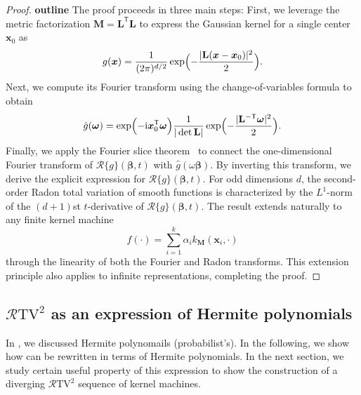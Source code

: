 \begin{proof}{\textbf{outline}}
The proof proceeds in three main steps:
First, we leverage the metric factorization $\mathbf{M}=\mathbf{L}^\mathsf{T}\mathbf{L}$ to express the Gaussian kernel for a single center $\bm{x}_0$ as
\[
g(\bm{x})=\frac{1}{(2\pi)^{d/2}}\exp\Bigl(-\frac{|\mathbf{L}(\bm{x}-\bm{x}_0)|^2}{2}\Bigr).
\]
Next, we compute its Fourier transform using the change-of-variables formula to obtain
\[
\hat{g}(\bm{\omega})=\exp\Bigl(-\mathrm{i}\bm{x}_0^\mathsf{T}\bm{\omega}\Bigr)\frac{1}{|\det \mathbf{L}|}\exp\Bigl(-\frac{|\mathbf{L}^{-\mathsf{T}}\bm{\omega}|^2}{2}\Bigr).
\]
Finally, we apply the Fourier slice theorem~\citep{kak_slaney} 
to connect the one-dimensional Fourier transform of $\mathcal{R}\{g\}(\bm{\beta},t)$ with $\hat{g}(\omega\bm{\beta})$. By inverting this transform, we derive the explicit expression for $\mathcal{R}\{g\}(\bm{\beta},t)$.
For odd dimensions $d$, the second-order Radon total variation of smooth functions is characterized by the $L^1$-norm of the $(d+1)$st $t$-derivative of $\mathcal{R}\{g\}(\bm{\beta},t)$. The result extends naturally to any finite kernel machine
\[
f(\cdot)=\sum_{i=1}^k \alpha_i k_\mathbf{M}(\bm{x}_i,\cdot)
\]
through the linearity of both the Fourier and Radon transforms. This extension principle also applies to infinite representations, completing the proof.
\end{proof}

\subsection{$\mathcal{R}\mathrm{TV}^2$ as an expression of Hermite polynomials}
In , we discussed Hermite polynomails (probabilist's). In the following, we show how  can be rewritten in terms of Hermite polynomials. In the next section, we study certain useful property of this expression to show the construction of a diverging $\mathcal{R}\mathrm{TV}^2$ sequence of kernel machines.

